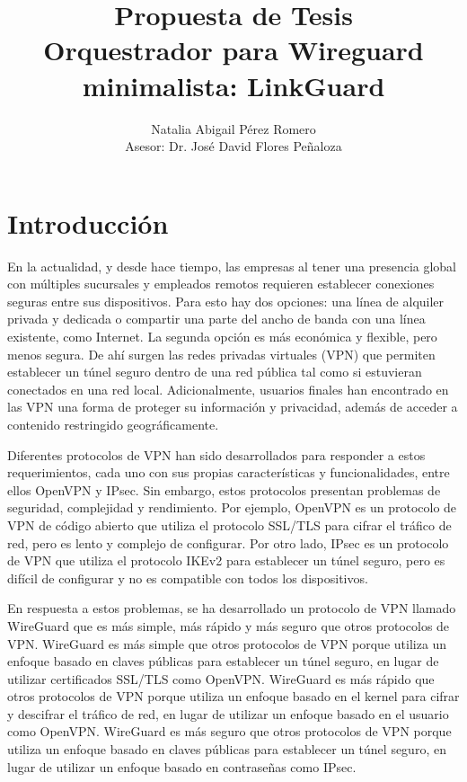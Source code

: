 \documentclass[letterpaper,12pt,oneside]{article}
\title{Propuesta de Tesis \\ Orquestrador para Wireguard minimalista: LinkGuard}
\author{Natalia Abigail Pérez Romero \\ Asesor: Dr. José David Flores Peñaloza}
\begin{document}
\maketitle


\section{Introducción}

En la actualidad, y desde hace tiempo, las empresas al tener una presencia global con múltiples sucursales y empleados remotos requieren establecer conexiones seguras entre sus dispositivos. Para esto hay dos opciones: una línea de alquiler privada y dedicada o compartir una parte del ancho de banda con una línea existente, como Internet. La segunda opción es más económica y flexible, pero menos segura. De ahí surgen las redes privadas virtuales (VPN) que permiten establecer un túnel seguro dentro de una red pública tal como si estuvieran conectados en una red local. Adicionalmente, usuarios finales han encontrado en las VPN una forma de proteger su información y privacidad, además de acceder a contenido restringido geográficamente.

Diferentes protocolos de VPN han sido desarrollados para responder a estos requerimientos, cada uno con sus propias características y funcionalidades, entre ellos OpenVPN y IPsec. Sin embargo, estos protocolos presentan problemas de seguridad, complejidad y rendimiento. Por ejemplo, OpenVPN es un protocolo de VPN de código abierto que utiliza el protocolo SSL/TLS para cifrar el tráfico de red, pero es lento y complejo de configurar. Por otro lado, IPsec es un protocolo de VPN que utiliza el protocolo IKEv2 para establecer un túnel seguro, pero es difícil de configurar y no es compatible con todos los dispositivos.

En respuesta a estos problemas, se ha desarrollado un protocolo de VPN llamado WireGuard que es más simple, más rápido y más seguro que otros protocolos de VPN. WireGuard es más simple que otros protocolos de VPN porque utiliza un enfoque basado en claves públicas para establecer un túnel seguro, en lugar de utilizar certificados SSL/TLS como OpenVPN. WireGuard es más rápido que otros protocolos de VPN porque utiliza un enfoque basado en el kernel para cifrar y descifrar el tráfico de red, en lugar de utilizar un enfoque basado en el usuario como OpenVPN. WireGuard es más seguro que otros protocolos de VPN porque utiliza un enfoque basado en claves públicas para establecer un túnel seguro, en lugar de utilizar un enfoque basado en contraseñas como IPsec.
\end{document}
